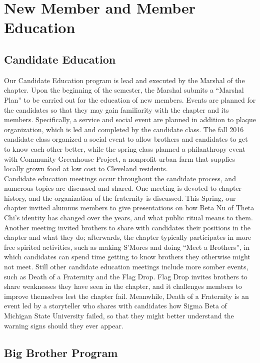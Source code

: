 \chapter{New Member and Member Education}

  \section*{Candidate Education}
    Our Candidate Education program is lead and executed by the Marshal of the chapter. Upon the beginning of the semester, the Marshal submits a ``Marshal Plan'' to be carried out for the education of new members. Events are planned for the candidates so that they may gain familiarity with the chapter and its members. Specifically, a service and social event are planned in addition to plaque organization, which is led and completed by the candidate class. The fall 2016 candidate class organized a social event to allow brothers and candidates to get to know each other better, while the spring class planned a philanthropy event with Community Greenhouse Project, a nonprofit urban farm that supplies locally grown food at low cost to Cleveland residents.\\
  
    Candidate education meetings occur throughout the candidate process, and numerous topics are discussed and shared. One meeting is devoted to chapter history, and the organization of the fraternity is discussed. This Spring, our chapter invited alumnus members to give presentations on how Beta Nu of Theta Chi’s identity has changed over the years, and what public ritual means to them. Another meeting invited brothers to share with candidates their positions in the chapter and what they do; afterwards, the chapter typically participates in more free spirited activities, such as making S’Mores and doing ``Meet a Brothers'', in which candidates can spend time getting to know brothers they otherwise might not meet. Still other candidate education meetings include more somber events, such as Death of a Fraternity and the Flag Drop. Flag Drop invites brothers to share weaknesses they have seen in the chapter, and it challenges members to improve themselves lest the chapter fail. Meanwhile, Death of a Fraternity is an event led by a storyteller who shares with candidates how Sigma Beta of Michigan State University failed, so that they might better understand the warning signs should they ever appear.
  
  \section*{Big Brother Program}
  
